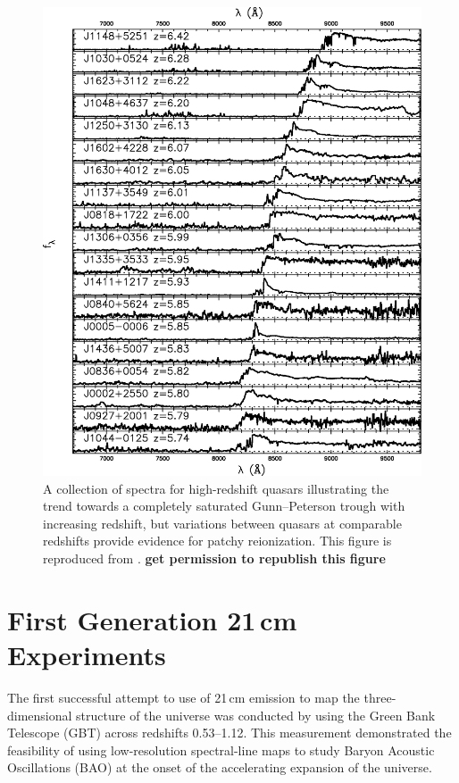 \begin{bibunit}
\begin{figure}[p]
    \centering
    \includegraphics[width=\textwidth]{figures/chapter1/fan-quasar-spectra}
    \caption{
        A collection of spectra for high-redshift quasars illustrating the trend towards a
        completely saturated Gunn--Peterson trough with increasing redshift, but variations between
        quasars at comparable redshifts provide evidence for patchy reionization. This figure is
        reproduced from \citet{2006AJ....132..117F}. \textbf{get permission to republish this
        figure}
    }
    \label{fig:fan-quasars}
\end{figure}

\section{First Generation 21\,cm Experiments}

The first successful attempt to use of 21\,cm emission to map the three-dimensional structure of the
universe was conducted by \citet{2010Natur.466..463C} using the Green Bank Telescope (GBT) across
redshifts 0.53--1.12. This measurement demonstrated the feasibility of using low-resolution
spectral-line maps to study Baryon Acoustic Oscillations (BAO) at the onset of the accelerating
expansion of the universe.


\end{bibunit}
